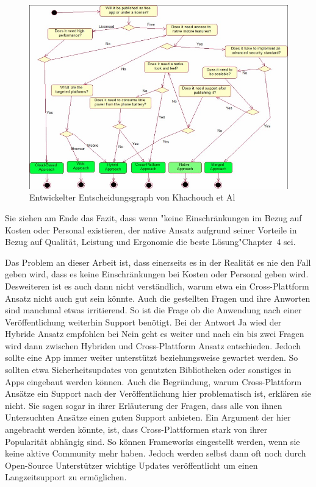 \begin{figure}[ht]
  \centering
  \includegraphics[width=\textwidth,keepaspectratio]{images/IEEE_Khachouch_Decision_Graph.jpg}
  \caption{Entwickelter Entscheidungsgraph von Khachouch et Al \cite{IEEE_Khackouch_Al}}
  \label{fig:decision_graph_IEEE_related_work}
\end{figure}

Sie ziehen am Ende das Fazit, dass wenn "keine Einschränkungen im Bezug auf Kosten oder Personal existieren, der native Ansatz aufgrund seiner Vorteile in Bezug auf Qualität, Leistung und Ergonomie die beste Lösung"\cite{IEEE_Khackouch_Al}{Chapter~4} sei.

Das Problem an dieser Arbeit ist, dass einerseits es in der Realität es nie den Fall geben wird, dass es keine Einschränkungen bei Kosten oder Personal geben wird. Desweiteren ist es auch dann nicht verständlich, warum etwa ein Cross-Plattform Ansatz nicht auch gut sein könnte. Auch die gestellten Fragen und ihre Anworten sind manchmal etwas irritierend. So ist die Frage ob die Anwendung nach einer Veröffentlichung weiterhin Support benötigt. Bei der Antwort Ja wied der Hybride Ansatz empfohlen bei Nein geht es weiter und nach ein bis zwei Fragen wird dann zwischen Hybriden und Cross-Plattform Ansatz entschieden. Jedoch sollte eine App immer weiter unterstützt beziehungsweise gewartet werden. So sollten etwa Sicherheitsupdates von genutzten Bibliotheken oder sonstiges in Apps eingebaut werden können. Auch die Begründung, warum Cross-Plattform Ansätze ein Support nach der Veröffentlichung hier problematisch ist, erklären sie nicht. Sie sagen sogar in ihrer Erläuterung der Fragen, dass alle von ihnen Untersuchten Ansätze einen guten Support anbieten.\cite{IEEE_Khackouch_Al} Ein Argument der hier angebracht werden könnte, ist, dass Cross-Plattformen stark von ihrer Popularität abhängig sind. So können Frameworks eingestellt werden, wenn sie keine aktive Community mehr haben. Jedoch werden selbst dann oft noch durch Open-Source Unterstützer wichtige Updates veröffentlicht um einen Langzeitsupport zu ermöglichen.